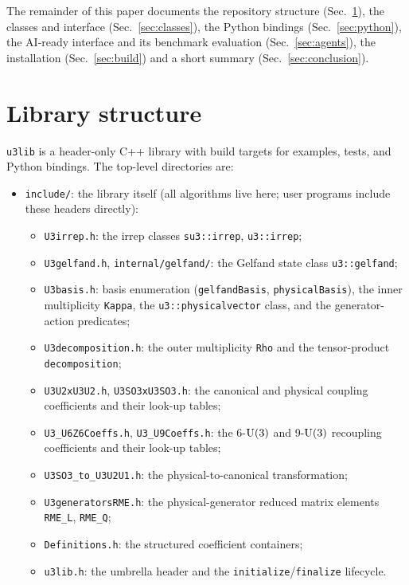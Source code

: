 \documentclass[aps,onecolumn,10pt,superscriptaddress,floatfix,nofootinbib]{revtex4}
\begin{document}
The remainder of this paper documents the repository structure
(Sec.~\ref{sec:structure}), the classes and interface (Sec.~\ref{sec:classes}),
the Python bindings (Sec.~\ref{sec:python}), the AI-ready interface and its
benchmark evaluation (Sec.~\ref{sec:agents}), the installation (Sec.~\ref{sec:build})
and a short summary (Sec.~\ref{sec:conclusion}).

\section{Library structure}
\label{sec:structure}

\texttt{u3lib} is a header-only C++ library with build targets for examples, tests, and Python bindings. The top-level
directories are:
\begin{itemize}
    \item \verb|include/|: the library itself (all algorithms live here; user
    programs include these headers directly):
    \begin{itemize}
        \item \verb|U3irrep.h|: the irrep classes \verb|su3::irrep|, \verb|u3::irrep|;
        \item \verb|U3gelfand.h|, \verb|internal/gelfand/|: the Gelfand state class \verb|u3::gelfand|;
        \item \verb|U3basis.h|: basis enumeration (\verb|gelfandBasis|, \verb|physicalBasis|), the inner multiplicity \verb|Kappa|, the \verb|u3::physicalvector| class, and the generator-action predicates;
        \item \verb|U3decomposition.h|: the outer multiplicity \verb|Rho| and the tensor-product \verb|decomposition|;
        \item \verb|U3U2xU3U2.h|, \verb|U3SO3xU3SO3.h|: the canonical and physical coupling coefficients and their look-up tables;
        \item \verb|U3_U6Z6Coeffs.h|, \verb|U3_U9Coeffs.h|: the 6-$\rm U(3)$ and 9-$\rm U(3)$ recoupling coefficients and their look-up tables;
        \item \verb|U3SO3_to_U3U2U1.h|: the physical-to-canonical transformation;
        \item \verb|U3generatorsRME.h|: the physical-generator reduced matrix elements \verb|RME_L|, \verb|RME_Q|;
        \item \verb|Definitions.h|: the structured coefficient containers;
        \item \verb|u3lib.h|: the umbrella header and the \verb|initialize|/\verb|finalize| lifecycle.

\end{itemize}
\end{itemize}
\end{document}
